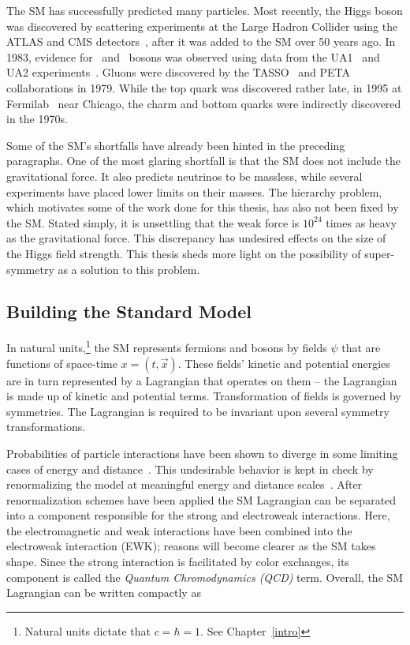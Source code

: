 \par The SM has successfully predicted many particles. Most recently, the Higgs boson was discovered by scattering 
experiments at the Large Hadron Collider using the ATLAS
 and CMS detectors~\cite{HIGG-2014-14}, after it was added to the SM 
over 50 years ago. In 1983, evidence for \Wpm\ and \Zboson\ bosons was observed using data from 
the UA1~\cite{ARNISON1983103} and UA2 experiments~\cite{Banner1983476}. Gluons were discovered by the 
TASSO~\cite{Brandelik:1979bd} and PETA~\cite{PhysRevLett.43.830} collaborations in 1979. While the top 
quark was discovered rather late, in 1995 at Fermilab~\cite{Campagnari:1996ai} near Chicago, 
the charm and bottom quarks were indirectly discovered in the 1970s.

\par Some of the SM's shortfalls have already been hinted in the preceding 
paragraphs. One of the most glaring shortfall is that the SM does not include 
the gravitational force. It also predicts neutrinos to be massless, while several 
experiments have placed lower limits on their masses. The hierarchy problem, which motivates 
some of the work done for this thesis, has also not been fixed by the SM. 
Stated simply, it is unsettling that the weak force is $10^{24}$ times as heavy as 
the gravitational force. This discrepancy has undesired effects on the size of the  
Higgs field strength. This thesis sheds more light on the possibility of super-symmetry 
as a solution to this problem.    

\subsection{Building the Standard Model}
\par In natural units,\footnote{Natural units dictate that 
$c=\hbar=1$. See Chapter~\ref{intro}} the SM represents fermions and bosons by fields $\psi$ that are 
functions of space-time $x = (t,\vec{x})$. These fields' kinetic and potential energies
 are in turn represented by a Lagrangian that 
operates on them -- the Lagrangian is made up of kinetic and potential terms. Transformation of  
fields is governed by symmetries. The Lagrangian is required to be 
invariant upon several symmetry transformations. 

\par Probabilities of particle interactions have been 
shown to diverge in some limiting cases of energy and distance~\cite{1995math6202G}.
This undesirable behavior is kept in check 
by renormalizing the model at meaningful energy and distance scales~\cite{Krasnikov:1996jq}.
After renormalization schemes have been applied the SM Lagrangian can be separated into a 
component responsible for the strong and electroweak interactions. Here, the electromagnetic 
and weak interactions have been combined into the electroweak interaction (EWK); reasons 
will become clearer as the SM takes shape. Since the strong interaction is facilitated by 
color exchanges, its component is called the {\it Quantum Chromodynamics (QCD)} term.
Overall, the SM Lagrangian can be written compactly as 

